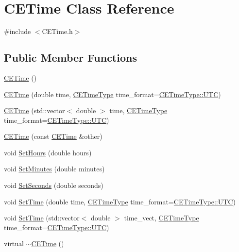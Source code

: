 \hypertarget{class_c_e_time}{}\section{C\+E\+Time Class Reference}
\label{class_c_e_time}


{\ttfamily \#include $<$C\+E\+Time.\+h$>$}

\subsection*{Public Member Functions}
\begin{DoxyCompactItemize}
\item 
\hyperlink{class_c_e_time_a018e49a38a31dc982ba9772e11b1fe61}{C\+E\+Time} ()
\item 
\hyperlink{class_c_e_time_a51fd336dc8cf6d47458a8c71c8ff5a6c}{C\+E\+Time} (double time, \hyperlink{_c_e_time_8h_ab50b2d3a782e5eea768b25bfb3d7e65f}{C\+E\+Time\+Type} time\+\_\+format=\hyperlink{_c_e_time_8h_ab50b2d3a782e5eea768b25bfb3d7e65fa2c56d07da8a08a92de9453a00e31d55d}{C\+E\+Time\+Type\+::\+U\+T\+C})
\item 
\hyperlink{class_c_e_time_aaf619d89df31f4299e772ab5a4048f01}{C\+E\+Time} (std\+::vector$<$ double $>$ time, \hyperlink{_c_e_time_8h_ab50b2d3a782e5eea768b25bfb3d7e65f}{C\+E\+Time\+Type} time\+\_\+format=\hyperlink{_c_e_time_8h_ab50b2d3a782e5eea768b25bfb3d7e65fa2c56d07da8a08a92de9453a00e31d55d}{C\+E\+Time\+Type\+::\+U\+T\+C})
\item 
\hyperlink{class_c_e_time_a4236696681a47639ba8d1bc62a871019}{C\+E\+Time} (const \hyperlink{class_c_e_time}{C\+E\+Time} \&other)
\item 
void \hyperlink{class_c_e_time_a678aab3e4a23617cea90252266ab2f04}{Set\+Hours} (double hours)
\item 
void \hyperlink{class_c_e_time_abbc4ddb4d831e79082e0a0cd6631f717}{Set\+Minutes} (double minutes)
\item 
void \hyperlink{class_c_e_time_a2b310f23e9beb7ecb7e9085d9577dd4f}{Set\+Seconds} (double seconds)
\item 
void \hyperlink{class_c_e_time_abfc3a19db6d6dd2ce286edcec6e6c7d0}{Set\+Time} (double time, \hyperlink{_c_e_time_8h_ab50b2d3a782e5eea768b25bfb3d7e65f}{C\+E\+Time\+Type} time\+\_\+format=\hyperlink{_c_e_time_8h_ab50b2d3a782e5eea768b25bfb3d7e65fa2c56d07da8a08a92de9453a00e31d55d}{C\+E\+Time\+Type\+::\+U\+T\+C})
\item 
void \hyperlink{class_c_e_time_a89a3f0684abbc324d84282fa983c284e}{Set\+Time} (std\+::vector$<$ double $>$ time\+\_\+vect, \hyperlink{_c_e_time_8h_ab50b2d3a782e5eea768b25bfb3d7e65f}{C\+E\+Time\+Type} time\+\_\+format=\hyperlink{_c_e_time_8h_ab50b2d3a782e5eea768b25bfb3d7e65fa2c56d07da8a08a92de9453a00e31d55d}{C\+E\+Time\+Type\+::\+U\+T\+C})
\item 
virtual \hyperlink{class_c_e_time_ad295fb04601db862c2c0f733ce0d4a46}{$\sim$\+C\+E\+Time} ()
\end{DoxyCompactItemize}
